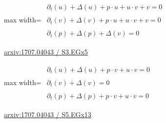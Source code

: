 \documentclass[10pt,a4paper]{article}
\begin{document}
\begin{minipage}{\linewidth}
\begin{center}\begin{adjustbox}{max width=\linewidth}$\displaystyle\begin{gathered}\begin{gathered}\partial_{t}(u)+\Delta(u)+p\cdot u+u\cdot v+v=0\end{gathered}\\[5pt]\begin{gathered}\partial_{t}(v)+\Delta(v)+p\cdot u+u\cdot v+v=0\end{gathered}\\[5pt]\begin{gathered}\partial_{t}(p)+\Delta(p)+\Delta(v)=0\end{gathered}\end{gathered}$\end{adjustbox}\end{center}
{\small \href{https://arxiv.org/html/1707.04043#S3.EGx5}{arxiv:1707.04043 / S3.EGx5}}\par
\end{minipage}\par\vspace{7mm}

\begin{minipage}{\linewidth}
\begin{center}\begin{adjustbox}{max width=\linewidth}$\displaystyle\begin{gathered}\begin{gathered}\partial_{t}(u)+\Delta(u)+p\cdot v+u\cdot v=0\end{gathered}\\[5pt]\begin{gathered}\partial_{t}(v)+\Delta(v)=0\end{gathered}\\[5pt]\begin{gathered}\partial_{t}(p)+\Delta(p)+p\cdot v+u\cdot v=0\end{gathered}\end{gathered}$\end{adjustbox}\end{center}
{\small \href{https://arxiv.org/html/1707.04043#S5.EGx13}{arxiv:1707.04043 / S5.EGx13}}\par
\end{minipage}\par\vspace{7mm}
\end{document}
